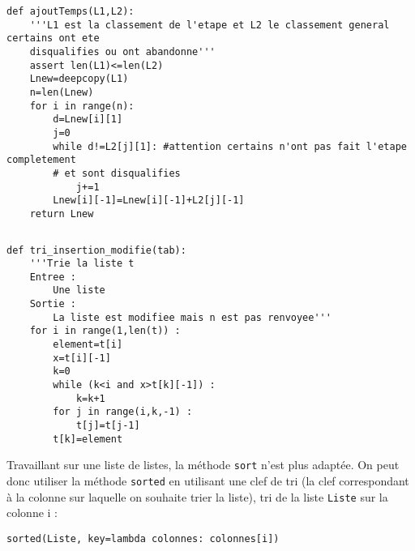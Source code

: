\ifprof
\begin{lstlisting}
def ajoutTemps(L1,L2):
    '''L1 est la classement de l'etape et L2 le classement general certains ont ete
    disqualifies ou ont abandonne'''
    assert len(L1)<=len(L2)
    Lnew=deepcopy(L1)
    n=len(Lnew)
    for i in range(n):
        d=Lnew[i][1]
        j=0
        while d!=L2[j][1]: #attention certains n'ont pas fait l'etape completement
        # et sont disqualifies
            j+=1
        Lnew[i][-1]=Lnew[i][-1]+L2[j][-1]
    return Lnew
\end{lstlisting}
\else\fi



\ifprof
\begin{lstlisting}
\end{lstlisting}
\else\fi





\ifprof
\begin{lstlisting}
def tri_insertion_modifie(tab):
    '''Trie la liste t
    Entree :
        Une liste
    Sortie :
        La liste est modifiee mais n est pas renvoyee'''
    for i in range(1,len(t)) :
        element=t[i]
        x=t[i][-1]
        k=0
        while (k<i and x>t[k][-1]) :
            k=k+1
        for j in range(i,k,-1) :
            t[j]=t[j-1]
        t[k]=element
\end{lstlisting}
\else\fi



\begin{rem}
Travaillant sur une liste de listes, la méthode \texttt{sort}  n'est plus adaptée. On peut donc utiliser la méthode \texttt{sorted} en utilisant une clef de tri (la clef correspondant à la colonne sur laquelle on souhaite trier la liste), tri de la liste \texttt{Liste} sur la colonne i :

\texttt{sorted(Liste, key=lambda colonnes: colonnes[i])}
\end{rem}



